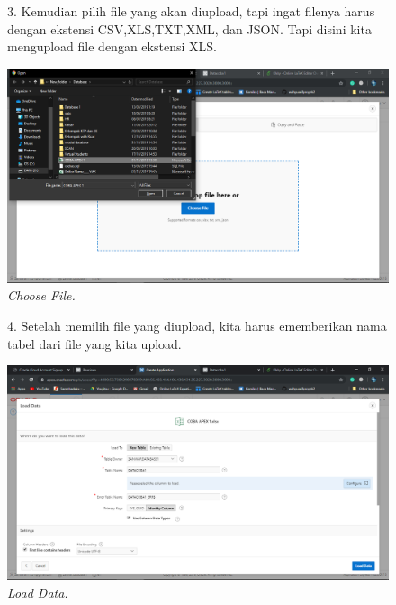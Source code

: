 \begin{enumerate}
    \begin{figure}[!htbp]
    \item[3.] Kemudian pilih file yang akan diupload, tapi ingat filenya harus dengan ekstensi CSV,XLS,TXT,XML, dan JSON. Tapi disini kita mengupload file dengan ekstensi XLS.
        \begin{center}
        \includegraphics[scale=0.3]{figures/Screenshot(73).png}
        \caption{\textit{Choose File.}}
        \end{center}   
    \end{figure}
    
    \begin{figure}[!htbp]
    \item[4.] Setelah memilih file yang diupload, kita harus ememberikan nama tabel dari file yang kita upload.
    \begin{center}
    \includegraphics[scale=0.3]{figures/Screenshot(75).png}
    \caption{\textit{Load Data.}}
    \end{center}   
    \end{figure}
    

\end{enumerate}
